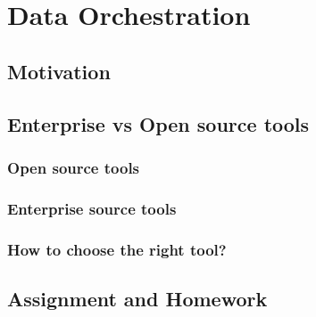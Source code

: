 \section{Data Orchestration}
\subsection{Motivation}
\subsection{Enterprise vs Open source tools}
\subsubsection{Open source tools}
\subsubsection{Enterprise source tools}
\subsubsection{How to choose the right tool?}
\subsection{Assignment and Homework}